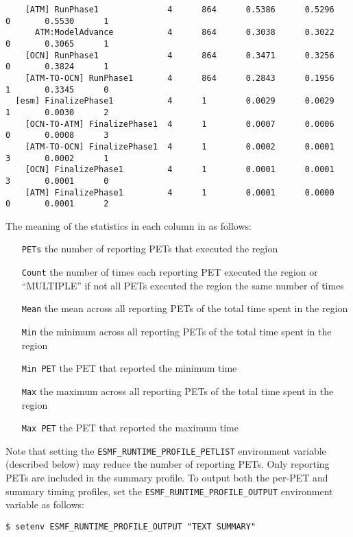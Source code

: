 \begin{verbatim}
    [ATM] RunPhase1              4      864      0.5386      0.5296      0       0.5530      1
      ATM:ModelAdvance           4      864      0.3038      0.3022      0       0.3065      1
    [OCN] RunPhase1              4      864      0.3471      0.3256      0       0.3824      1
    [ATM-TO-OCN] RunPhase1       4      864      0.2843      0.1956      1       0.3345      0
  [esm] FinalizePhase1           4      1        0.0029      0.0029      1       0.0030      2
    [OCN-TO-ATM] FinalizePhase1  4      1        0.0007      0.0006      0       0.0008      3
    [ATM-TO-OCN] FinalizePhase1  4      1        0.0002      0.0001      3       0.0002      1
    [OCN] FinalizePhase1         4      1        0.0001      0.0001      3       0.0001      0
    [ATM] FinalizePhase1         4      1        0.0001      0.0000      0       0.0001      2
\end{verbatim}

The meaning of the statistics in each column in as follows:
\begin{itemize}
\item [{\tt PETs}] the number of reporting PETs that executed the region
\item [{\tt Count}] the number of times each reporting PET executed the region
      or ``MULTIPLE'' if not all PETs executed the region the same number of times
\item [{\tt Mean}] the mean across all reporting PETs of the total time spent in the region
\item [{\tt Min}] the minimum across all reporting PETs of the total time spent in the region
\item [{\tt Min PET}] the PET that reported the minimum time
\item [{\tt Max}] the maximum across all reporting PETs of the total time spent in the region
\item [{\tt Max PET}] the PET that reported the maximum time
\end{itemize}

Note that setting the {\tt ESMF\_RUNTIME\_PROFILE\_PETLIST} environment variable
(described below) may reduce the number of reporting PETs. Only reporting PETs are
included in the summary profile. To output both the per-PET and summary timing profiles,
set the {\tt ESMF\_RUNTIME\_PROFILE\_OUTPUT} environment variable as follows:

\begin{verbatim}
$ setenv ESMF_RUNTIME_PROFILE_OUTPUT "TEXT SUMMARY"
\end{verbatim}


